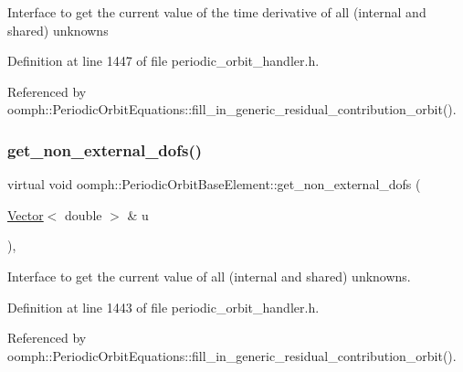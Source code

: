 Interface to get the current value of the time derivative of all (internal and shared) unknowns 

Definition at line 1447 of file periodic\+\_\+orbit\+\_\+handler.\+h.



Referenced by oomph\+::\+Periodic\+Orbit\+Equations\+::fill\+\_\+in\+\_\+generic\+\_\+residual\+\_\+contribution\+\_\+orbit().

\mbox{\label{classoomph_1_1PeriodicOrbitBaseElement_abba1af9fcade9cb3348ba3211b4241b6}} 
\subsubsection{\texorpdfstring{get\+\_\+non\+\_\+external\+\_\+dofs()}{get\_non\_external\_dofs()}}
{\footnotesize\ttfamily virtual void oomph\+::\+Periodic\+Orbit\+Base\+Element\+::get\+\_\+non\+\_\+external\+\_\+dofs (\begin{DoxyParamCaption}\item[{\hyperlink{classoomph_1_1Vector}{Vector}$<$ double $>$ \&}]{u }\end{DoxyParamCaption})\hspace{0.3cm}{\ttfamily [inline]}, {\ttfamily [virtual]}}



Interface to get the current value of all (internal and shared) unknowns. 



Definition at line 1443 of file periodic\+\_\+orbit\+\_\+handler.\+h.



Referenced by oomph\+::\+Periodic\+Orbit\+Equations\+::fill\+\_\+in\+\_\+generic\+\_\+residual\+\_\+contribution\+\_\+orbit().

\mbox{\label{classoomph_1_1PeriodicOrbitBaseElement_a6d543d9fa979ed60cec6b5f0dac4b0d6}} 
